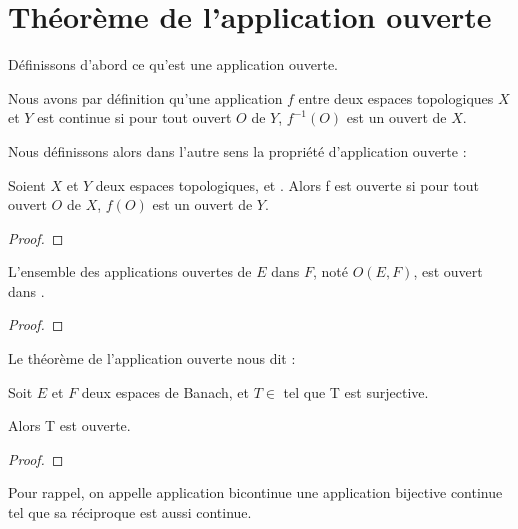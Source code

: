 \chapter{Théorème de l'application ouverte}

Définissons d'abord ce qu'est une application ouverte.

Nous avons par définition qu'une application $f$ entre deux espaces topologiques
$X$ et $Y$ est continue si pour tout ouvert $O$ de $Y$, $f^{-1}(O)$ est un
ouvert de $X$.

Nous définissons alors dans l'autre sens la propriété d'application ouverte :

\begin{definition}
	Soient $X$ et $Y$ deux espaces topologiques, et . Alors
	f est ouverte si pour tout ouvert $O$ de $X$, $f(O)$ est un ouvert de $Y$.
\end{definition}


\begin{proof}
	
\end{proof}

\begin{proposition}
	L'ensemble des applications ouvertes de $E$ dans $F$, noté $O(E, F)$, est
	ouvert dans .
\end{proposition}

\begin{proof}
	
\end{proof}

Le théorème de l'application ouverte nous dit :

\begin{theorem} 
	Soit $E$ et $F$ deux espaces de Banach, et $T \in$  tel
	que T est surjective.

	Alors T est ouverte.
	\label{open-application-theorem}
\end{theorem}

\begin{proof}
	
\end{proof}

Pour rappel, on appelle application bicontinue une application bijective
continue tel que sa réciproque est aussi continue.

